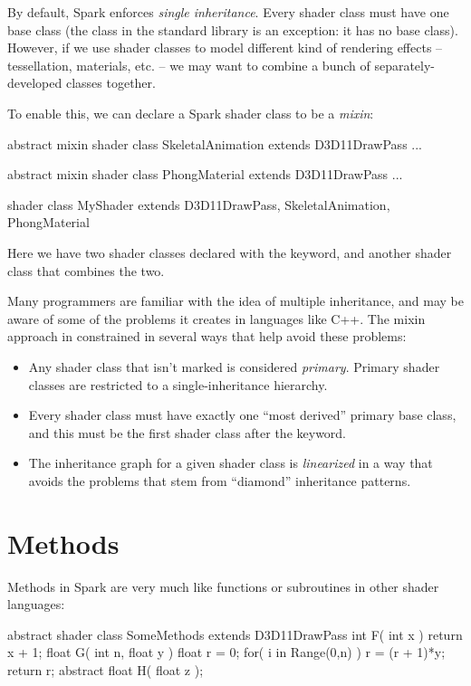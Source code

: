 \documentclass[]{report}
\newenvironment{codeblock}%
{\begin{center}\begin{codebox}}%
{\end{codebox}\end{center}}
\newcommand{\code}[1]{\text{\lstinline[style=spark_style]{#1}}}
\newcommand{\kw}[1]{\text{\texttt{\textbf{\textcolor{keyword_color}{#1}}}}}
\begin{document}
By default, Spark enforces \emph{single inheritance}.
Every shader class must have one base class (the \code{D3D11DrawPass} class in the standard library is an exception: it has no base class).
However, if we use shader classes to model different kind of rendering effects -- tessellation, materials, etc. -- we may want to combine a bunch of separately-developed classes together.

To enable this, we can declare a Spark shader class to be a \emph{mixin}:
\begin{codeblock}
\begin{spark}
abstract mixin shader class SkeletalAnimation
    extends D3D11DrawPass
{
    ...
}

abstract mixin shader class PhongMaterial
    extends D3D11DrawPass
{
    ...
}

shader class MyShader
    extends D3D11DrawPass,
            SkeletalAnimation,
            PhongMaterial
{
}
\end{spark}
\end{codeblock}
Here we have two shader classes declared with the \kw{mixin} keyword, and another shader class that combines the two.

Many programmers are familiar with the idea of multiple inheritance, and may be aware of some of the problems it creates in languages like C++.
The mixin approach in constrained in several ways that help avoid these problems:
\begin{itemize}
\item{Any shader class that isn't marked \kw{mixin} is considered \emph{primary}. Primary shader classes are restricted to a single-inheritance hierarchy.}
\item{Every shader class must have exactly one ``most derived'' primary base class, and this must be the first shader class after the \kw{extends} keyword.}
\item{The inheritance graph for a given shader class is \emph{linearized} in a way that avoids the problems that stem from ``diamond'' inheritance patterns.}
\end{itemize}

\section{Methods}
\label{sec:methoddeclguide}

Methods in Spark are very much like functions or subroutines in other shader languages:
\begin{codeblock}
\begin{spark}
abstract shader class SomeMethods extends D3D11DrawPass
{
    int F( int x ) { return x + 1; }
    float G( int n, float y )
    {
        float r = 0;
        for( i in Range(0,n) )
            r = (r + 1)*y;
        return r;
    }
    abstract float H( float z );
}
\end{spark}
\end{codeblock}
\end{document}
